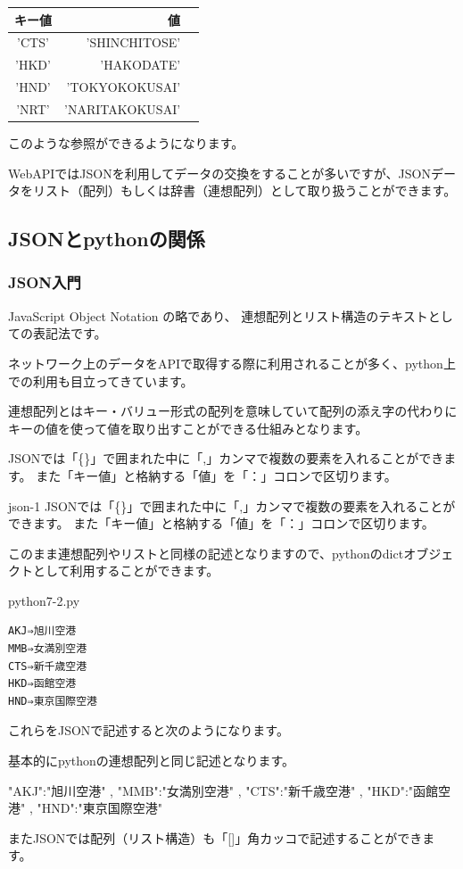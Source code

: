 \documentclass[11pt,a4paper,dvipdfmx,titlepage]{jsreport}
\begin{document}
\begin{center}
\begin{tabular}{|c|r|r|} 
\hline
 キー値& 値 \\ \hline \hline
 'CTS' &  'SHINCHITOSE' \\ \hline
 'HKD' &  'HAKODATE' \\ \hline
 'HND' &  'TOKYOKOKUSAI' \\ \hline
 'NRT' &  'NARITAKOKUSAI' \\ \hline
\end{tabular}
\end{center}

このような参照ができるようになります。

WebAPIではJSONを利用してデータの交換をすることが多いですが、JSONデータをリスト（配列）もしくは辞書（連想配列）として取り扱うことができます。

\subsection{JSONとpythonの関係}

\subsubsection{JSON入門}
JavaScript Object Notation の略であり、
連想配列とリスト構造のテキストとしての表記法です。

ネットワーク上のデータをAPIで取得する際に利用されることが多く、python上での利用も目立ってきています。

連想配列とはキー・バリュー形式の配列を意味していて配列の添え字の代わりにキーの値を使って値を取り出すことができる仕組みとなります。

JSONでは「\{\}」で囲まれた中に「,」カンマで複数の要素を入れることができます。
また「キー値」と格納する「値」を「：」コロンで区切ります。

\begin{pabox}{json-1}
JSONでは「\{\}」で囲まれた中に「,」カンマで複数の要素を入れることができます。
また「キー値」と格納する「値」を「：」コロンで区切ります。

このまま連想配列やリストと同様の記述となりますので、pythonのdictオブジェクトとして利用することができます。
\begin{codebox}{python7-2.py}
\begin{verbatim}
AKJ⇒旭川空港
MMB⇒女満別空港
CTS⇒新千歳空港
HKD⇒函館空港
HND⇒東京国際空港   
\end{verbatim}
これらをJSONで記述すると次のようになります。

基本的にpythonの連想配列と同じ記述となります。
\begin{listing}{1}
{
 "AKJ":"旭川空港" ,
 "MMB":"女満別空港" , 
 "CTS":"新千歳空港" ,
 "HKD":"函館空港" ,
 "HND":"東京国際空港"
}
\end{listing}

\end{codebox}
\end{pabox}
またJSONでは配列（リスト構造）も「[]」角カッコで記述することができます。
\end{document}
